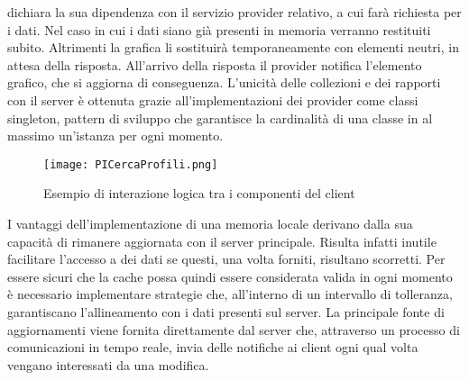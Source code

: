 dichiara la sua dipendenza con il servizio provider relativo, 
a cui farà richiesta per i dati.
Nel caso in cui i dati siano già presenti in memoria verranno restituiti subito.
Altrimenti la grafica li sostituirà temporaneamente con elementi neutri,
in attesa della risposta.
All'arrivo della risposta il provider notifica l'elemento grafico, 
che si aggiorna di conseguenza.
L'unicità delle collezioni e dei rapporti con il server è ottenuta 
grazie all'implementazioni dei provider come classi singleton,
pattern di sviluppo che garantisce la cardinalità di una classe 
in al massimo un'istanza per ogni momento.\\
\begin{figure}[h!]
    \centering
    \texttt{[image: PICercaProfili.png]}
    \caption{Esempio di interazione logica tra i componenti del client}
\end{figure}
\clearpage
I vantaggi dell'implementazione di una memoria locale
derivano dalla sua capacità di rimanere aggiornata con il server principale.
Risulta infatti inutile facilitare l'accesso a dei dati 
se questi, una volta forniti, risultano scorretti.
Per essere sicuri che la cache possa quindi essere considerata valida in ogni momento
è necessario implementare strategie che, 
all'interno di un intervallo di tolleranza,
garantiscano l'allineamento con i dati presenti sul server.
La principale fonte di aggiornamenti viene fornita direttamente dal server che,
attraverso un processo di comunicazioni in tempo reale,
invia delle notifiche ai client ogni qual volta vengano interessati da una modifica.\\

